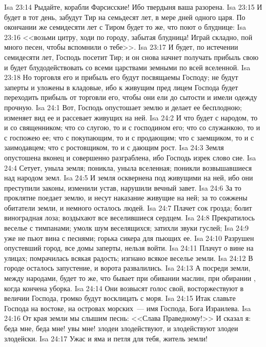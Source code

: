 \vs Isa 23:14 Рыдайте, корабли Фарсисские! Ибо твердыня ваша разорена.
\rsbpar\vs Isa 23:15 И будет в тот день, забудут Тир на семьдесят лет, в мере дней одного царя. По окончании же семидесяти лет с Тиром будет то же, что поют о блуднице:
\vs Isa 23:16 <<возьми цитру, ходи по городу, забытая блудница! Играй складно, пой много песен, чтобы вспомнили о тебе>>.
\vs Isa 23:17 И будет, по истечении семидесяти лет, Господь посетит Тир; и он снова начнет получать прибыль свою и будет блудодействовать со всеми царствами земными по всей вселенной.
\vs Isa 23:18 Но торговля его и прибыль его будут посвящаемы Господу; не будут заперты и уложены в кладовые, ибо к живущим пред лицем Господа будет переходить прибыль от торговли его, чтобы они ели до сытости и имели одежду прочную.
\vs Isa 24:1 Вот, Господь опустошает землю и делает ее бесплодною; изменяет вид ее и рассевает живущих на ней.
\vs Isa 24:2 И что будет с народом, то и со священником; что со слугою, то и с господином его; что со служанкою, то и с госпожею ее; что с покупающим, то и с продающим; что с заемщиком, то и с заимодавцем; что с ростовщиком, то и с дающим рост.
\vs Isa 24:3 Земля опустошена вконец и совершенно разграблена, ибо Господь изрек слово сие.
\vs Isa 24:4 Сетует, уныла земля; поникла, уныла вселенная; поникли возвышавшиеся над народом земл.
\vs Isa 24:5 И земля осквернена под живущими на ней, ибо они преступили законы, изменили устав, нарушили вечный завет.
\vs Isa 24:6 За то проклятие поедает землю, и несут наказание живущие на ней; за то сожжены обитатели земли, и немного осталось людей.
\vs Isa 24:7 Плачет сок грозда; болит виноградная лоза; воздыхают все веселившиеся сердцем.
\vs Isa 24:8 Прекратилось веселье с тимпанами; умолк шум веселящихся; затихли звуки гуслей;
\vs Isa 24:9 уже не пьют вина с песнями; горька сикера для пьющих ее.
\vs Isa 24:10 Разрушен опустевший город, все домы заперты, нельзя войти.
\vs Isa 24:11 Плачут о вине на улицах; помрачилась всякая радость; изгнано всякое веселье земли.
\vs Isa 24:12 В городе осталось запустение, и ворота развалились.
\vs Isa 24:13 А посреди земли, между народами, будет то же, что бывает при обивании маслин, при обирании , когда кончена уборка.
\vs Isa 24:14 Они возвысят голос свой, восторжествуют в величии Господа, громко будут восклицать с моря.
\vs Isa 24:15 Итак славьте Господа на востоке, на островах морских~--- имя Господа, Бога Израилева.
\vs Isa 24:16 От края земли мы слышим песнь: <<Слава Праведному!>> И сказал я: беда мне, беда мне! увы мне! злодеи злодействуют, и злодействуют злодеи злодейски.
\vs Isa 24:17 Ужас и яма и петля для тебя, житель земли!
